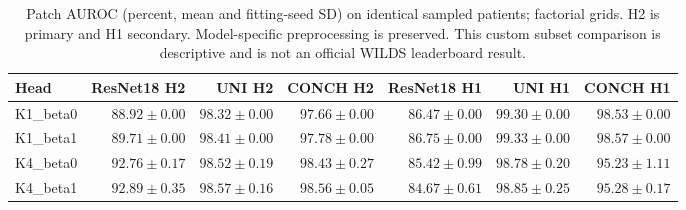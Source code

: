 \begin{table}[p]
\centering\small
\setlength{\tabcolsep}{3pt}
\begin{tabular}{lrrrrrr}
\hline
Head & ResNet18 H2 & UNI H2 & CONCH H2 & ResNet18 H1 & UNI H1 & CONCH H1 \\
\hline
K1\_beta0 & $88.92\pm0.00$ & $98.32\pm0.00$ & $97.66\pm0.00$ & $86.47\pm0.00$ & $99.30\pm0.00$ & $98.53\pm0.00$ \\
K1\_beta1 & $89.71\pm0.00$ & $98.41\pm0.00$ & $97.78\pm0.00$ & $86.75\pm0.00$ & $99.33\pm0.00$ & $98.57\pm0.00$ \\
K4\_beta0 & $92.76\pm0.17$ & $98.52\pm0.19$ & $98.43\pm0.27$ & $85.42\pm0.99$ & $98.78\pm0.20$ & $95.23\pm1.11$ \\
K4\_beta1 & $92.89\pm0.35$ & $98.57\pm0.16$ & $98.56\pm0.05$ & $84.67\pm0.61$ & $98.85\pm0.25$ & $95.28\pm0.17$ \\
\hline
\end{tabular}
\caption{Patch AUROC (percent, mean and fitting-seed SD) on identical sampled patients; factorial grids. H2 is primary and H1 secondary. Model-specific preprocessing is preserved. This custom subset comparison is descriptive and is not an official WILDS leaderboard result.}
\label{tab:supp_factorial_auroc}
\end{table}
